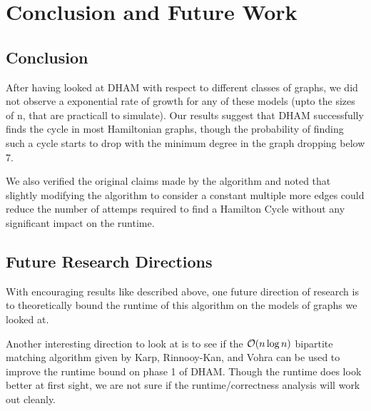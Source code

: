 \chapter{Conclusion and Future Work}
\label{ch:concl}

\section{Conclusion}
After having looked at DHAM with respect to different classes of graphs, we did not observe a exponential rate of growth for any of these models (upto the sizes of n, that are practicall to simulate). Our results suggest that DHAM successfully finds the cycle in most Hamiltonian graphs, though the probability of finding such a cycle starts to drop with the minimum degree in the graph dropping below 7.

We also verified the original claims made by the algorithm and noted that slightly modifying the algorithm to consider a constant multiple more edges could reduce the number of attemps required to find a Hamilton Cycle without any significant impact on the runtime.

\section{Future Research Directions}

With encouraging results like described above, one future direction of research is to theoretically bound the runtime of this algorithm on the models of graphs we looked at. 

Another interesting direction to look at is to see if the $\mathcal{O}(n\log n)$ bipartite matching algorithm given by Karp, Rinnooy-Kan, and Vohra\cite{karp:bip} can be used to improve the runtime bound on phase 1 of DHAM. Though the runtime does look better at first sight, we are not sure if the runtime/correctness analysis will work out cleanly.
